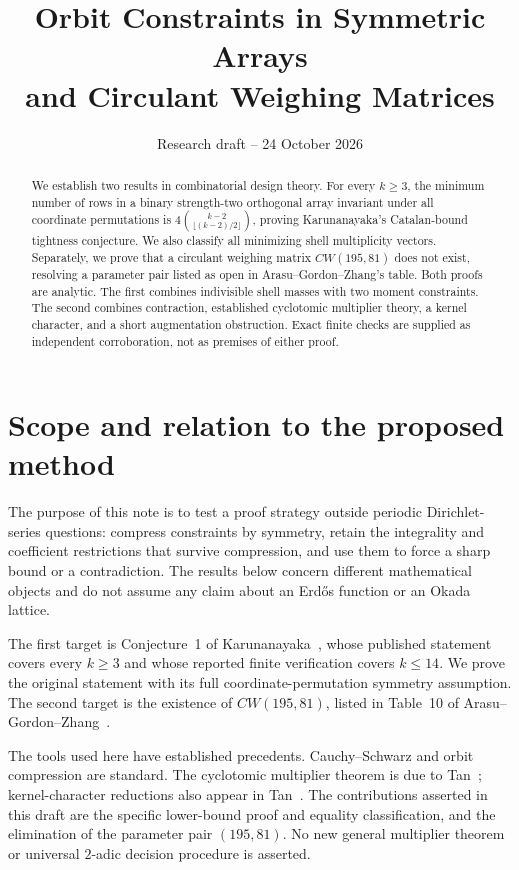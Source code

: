 \documentclass[11pt]{article}
\title{Orbit Constraints in Symmetric Arrays\\and Circulant Weighing Matrices}
\author{}
\date{Research draft -- 24 October 2026}
\theoremstyle{remark}
\numberwithin{equation}{section}
\begin{document}
\maketitle
\begin{abstract}
We establish two results in combinatorial design theory. For every $k\ge3$,
the minimum number of rows in a binary strength-two orthogonal array invariant
under all coordinate permutations is
$4\binom{k-2}{\lfloor(k-2)/2\rfloor}$, proving Karunanayaka's
Catalan-bound tightness conjecture. We also classify all minimizing shell
multiplicity vectors. Separately, we prove that a circulant weighing matrix
$CW(195,81)$ does not exist, resolving a parameter pair listed as open in
Arasu--Gordon--Zhang's table. Both proofs are analytic. The first combines
indivisible shell masses with two moment constraints. The second combines
contraction, established cyclotomic multiplier theory, a kernel character,
and a short augmentation obstruction. Exact finite checks are supplied as
independent corroboration, not as premises of either proof.
\end{abstract}

\section{Scope and relation to the proposed method}

The purpose of this note is to test a proof strategy outside periodic
Dirichlet-series questions: compress constraints by symmetry, retain the
integrality and coefficient restrictions that survive compression, and use
them to force a sharp bound or a contradiction. The results below concern
different mathematical objects and do not assume any claim about an
Erd\H{o}s function or an Okada lattice.

The first target is Conjecture~1 of Karunanayaka~\cite{Karunanayaka2026},
whose published statement covers every $k\ge3$ and whose reported finite
verification covers $k\le14$. We prove the original statement with its full
coordinate-permutation symmetry assumption. The second target is the
existence of $CW(195,81)$, listed in Table~10 of
Arasu--Gordon--Zhang~\cite{ArasuGordonZhang2021}.

The tools used here have established precedents. Cauchy--Schwarz and orbit
compression are standard. The cyclotomic multiplier theorem is due to
Tan~\cite{Tan2018}; kernel-character reductions also appear in
Tan~\cite{Tan2026}. The contributions asserted in this draft are the
specific lower-bound proof and equality classification, and the elimination
of the parameter pair $(195,81)$. No new general multiplier theorem or
universal $2$-adic decision procedure is asserted.
\end{document}
